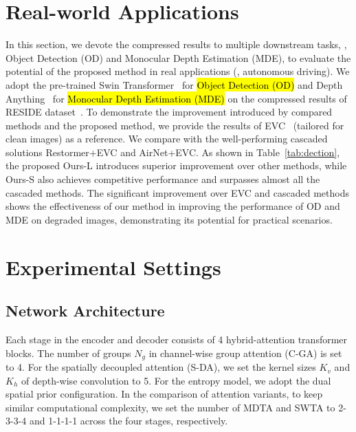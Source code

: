   
\section{Real-world Applications} \label{supp_sec:real_apply} 
In this section, we devote the compressed results to multiple downstream tasks, \ie, Object Detection (OD) and Monocular Depth Estimation (MDE), to evaluate the potential of the proposed method in real applications (\eg, autonomous driving). We adopt the pre-trained Swin Transformer~\cite{swin} for \hl{Object Detection (OD)}  and Depth Anything~\cite{yang2024depth} for \hl{Monocular Depth Estimation (MDE)} on the compressed results of RESIDE dataset~\cite{reside}.  To demonstrate the improvement introduced by compared methods and the proposed method, we provide the results of EVC~\cite{evc} (tailored for clean images) as a reference. We compare with the well-performing cascaded solutions Restormer+EVC and AirNet+EVC. As shown in Table~\ref{tab:dection}, the proposed Ours-L introduces superior improvement over other methods, while Ours-S also achieves competitive performance and surpasses almost all the cascaded methods. The significant improvement over EVC and cascaded methods shows the effectiveness of our method in improving the performance of OD and MDE on degraded images, demonstrating its potential for practical scenarios. 



\section{Experimental Settings}\label{supp_sec:exp}  
\subsection{Network Architecture}\label{supp_sec:network} 
Each stage in the encoder and decoder consists of 4 hybrid-attention transformer blocks.  The number of groups $N_g$ in channel-wise group attention (C-GA) is set to 4. For the spatially decoupled attention (S-DA), we set the kernel sizes $K_v$ and $K_h$ of depth-wise convolution to 5.   For the entropy model, we adopt the dual spatial prior configuration\cite{mm}. In the comparison of attention variants, to keep similar computational complexity, we set the number of MDTA and SWTA to 2-3-3-4 and 1-1-1-1 across the four stages, respectively. 


